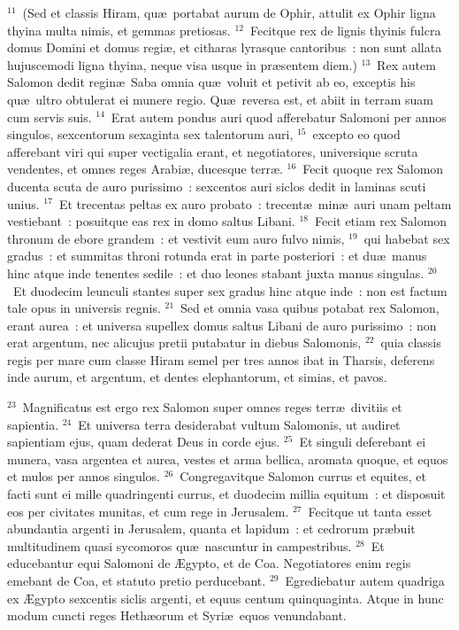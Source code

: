 ${}^{11}$~(Sed et classis Hiram, qu\ae\ portabat aurum de Ophir, attulit ex Ophir ligna thyina multa nimis, et gemmas pretiosas.
${}^{12}$~Fecitque rex de lignis thyinis fulcra domus Domini et domus regi\ae , et citharas lyrasque cantoribus~: non sunt allata hujuscemodi ligna thyina, neque visa usque in pr\ae sentem diem.)
${}^{13}$~Rex autem Salomon dedit regin\ae\ Saba omnia qu\ae\ voluit et petivit ab eo, exceptis his qu\ae\ ultro obtulerat ei munere regio. Qu\ae\ reversa est, et abiit in terram suam cum servis suis.
${}^{14}$~Erat autem pondus auri quod afferebatur Salomoni per annos singulos, sexcentorum sexaginta sex talentorum auri,
${}^{15}$~excepto eo quod afferebant viri qui super vectigalia erant, et negotiatores, universique scruta vendentes, et omnes reges Arabi\ae , ducesque terr\ae .
${}^{16}$~Fecit quoque rex Salomon ducenta scuta de auro purissimo~: sexcentos auri siclos dedit in laminas scuti unius.
${}^{17}$~Et trecentas peltas ex auro probato~: trecent\ae\ min\ae\ auri unam peltam vestiebant~: posuitque eas rex in domo saltus Libani.
${}^{18}$~Fecit etiam rex Salomon thronum de ebore grandem~: et vestivit eum auro fulvo nimis,
${}^{19}$~qui habebat sex gradus~: et summitas throni rotunda erat in parte posteriori~: et du\ae\ manus hinc atque inde tenentes sedile~: et duo leones stabant juxta manus singulas.
${}^{20}$~Et duodecim leunculi stantes super sex gradus hinc atque inde~: non est factum tale opus in universis regnis.
${}^{21}$~Sed et omnia vasa quibus potabat rex Salomon, erant aurea~: et universa supellex domus saltus Libani de auro purissimo~: non erat argentum, nec alicujus pretii putabatur in diebus Salomonis,
${}^{22}$~quia classis regis per mare cum classe Hiram semel per tres annos ibat in Tharsis, deferens inde aurum, et argentum, et dentes elephantorum, et simias, et pavos.


${}^{23}$~Magnificatus est ergo rex Salomon super omnes reges terr\ae\ divitiis et sapientia.
${}^{24}$~Et universa terra desiderabat vultum Salomonis, ut audiret sapientiam ejus, quam dederat Deus in corde ejus.
${}^{25}$~Et singuli deferebant ei munera, vasa argentea et aurea, vestes et arma bellica, aromata quoque, et equos et mulos per annos singulos.
${}^{26}$~Congregavitque Salomon currus et equites, et facti sunt ei mille quadringenti currus, et duodecim millia equitum~: et disposuit eos per civitates munitas, et cum rege in Jerusalem.
${}^{27}$~Fecitque ut tanta esset abundantia argenti in Jerusalem, quanta et lapidum~: et cedrorum pr\ae buit multitudinem quasi sycomoros qu\ae\ nascuntur in campestribus.
${}^{28}$~Et educebantur equi Salomoni de \AE gypto, et de Coa. Negotiatores enim regis emebant de Coa, et statuto pretio perducebant.
${}^{29}$~Egrediebatur autem quadriga ex \AE gypto sexcentis siclis argenti, et equus centum quinquaginta. Atque in hunc modum cuncti reges Heth\ae orum et Syri\ae\ equos venundabant.

